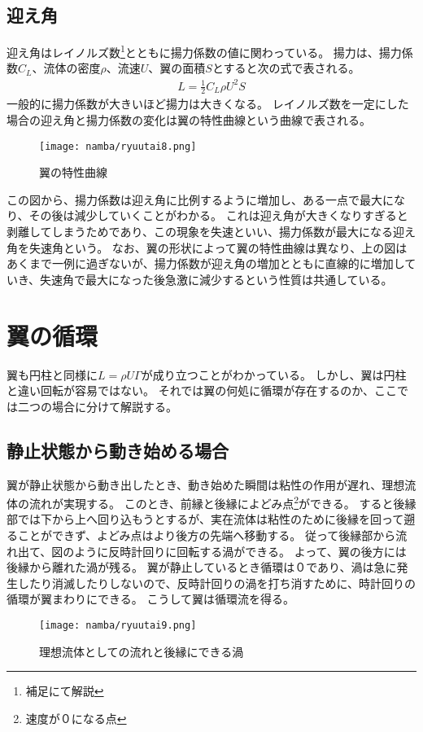 \documentclass[10pt,b5paper,papersize,dvipdfmx]{jsbook}
\begin{document}
\subsection{迎え角}
迎え角はレイノルズ数\footnote{補足にて解説}とともに揚力係数の値に関わっている。
揚力は、揚力係数$C_L$、流体の密度$\rho $、流速$U$、翼の面積$S$とすると次の式で表される。
\begin{align}
  L = \frac{1}{2}C_L\rho U^2S
\end{align}
一般的に揚力係数が大きいほど揚力は大きくなる。
レイノルズ数を一定にした場合の迎え角と揚力係数の変化は翼の特性曲線という曲線で表される。
\par
\begin{figure}[ht]
  \centering
  \texttt{[image: namba/ryuutai8.png]}
  \caption{翼の特性曲線}
\end{figure}
この図から、揚力係数は迎え角に比例するように増加し、ある一点で最大になり、その後は減少していくことがわかる。
これは迎え角が大きくなりすぎると剥離してしまうためであり、この現象を失速といい、揚力係数が最大になる迎え角を失速角という。
なお、翼の形状によって翼の特性曲線は異なり、上の図はあくまで一例に過ぎないが、揚力係数が迎え角の増加とともに直線的に増加していき、失速角で最大になった後急激に減少するという性質は共通している。
\section{翼の循環}
翼も円柱と同様に$L = \rho U\Gamma $が成り立つことがわかっている。
しかし、翼は円柱と違い回転が容易ではない。
それでは翼の何処に循環が存在するのか、ここでは二つの場合に分けて解説する。
\subsection{静止状態から動き始める場合}
翼が静止状態から動き出したとき、動き始めた瞬間は粘性の作用が遅れ、理想流体の流れが実現する。
このとき、前縁と後縁によどみ点\footnote{速度が０になる点}ができる。
すると後縁部では下から上へ回り込もうとするが、実在流体は粘性のために後縁を回って遡ることができず、よどみ点はより後方の先端へ移動する。
従って後縁部から流れ出て、図のように反時計回りに回転する渦ができる。
よって、翼の後方には後縁から離れた渦が残る。
翼が静止しているとき循環は０であり、渦は急に発生したり消滅したりしないので、反時計回りの渦を打ち消すために、時計回りの循環が翼まわりにできる。
こうして翼は循環流を得る。
\begin{figure}[ht]
  \centering
  \texttt{[image: namba/ryuutai9.png]}
  \caption{理想流体としての流れと後縁にできる渦}
\end{figure}
\end{document}
